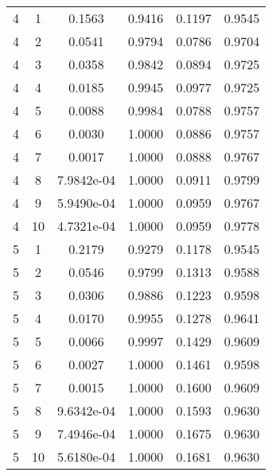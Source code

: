 \begin{center}
\begin{longtable}{|c|c|c|c|c|c|}
\hline
4 & 1 & 0.1563 & 0.9416 & 0.1197 & 0.9545 \\
4 & 2 & 0.0541 & 0.9794 & 0.0786 & 0.9704 \\
4 & 3 & 0.0358 & 0.9842 & 0.0894 & 0.9725 \\
4 & 4 & 0.0185 & 0.9945 & 0.0977 & 0.9725 \\
4 & 5 & 0.0088 & 0.9984 & 0.0788 & 0.9757 \\
4 & 6 & 0.0030 & 1.0000 & 0.0886 & 0.9757 \\
4 & 7 & 0.0017 & 1.0000 & 0.0888 & 0.9767 \\
4 & 8 & 7.9842e-04 & 1.0000 & 0.0911 & 0.9799 \\
4 & 9 & 5.9490e-04 & 1.0000 & 0.0959 & 0.9767 \\
4 & 10 & 4.7321e-04 & 1.0000 & 0.0959 & 0.9778 \\
\hline
5 & 1 & 0.2179 & 0.9279 & 0.1178 & 0.9545 \\
5 & 2 & 0.0546 & 0.9799 & 0.1313 & 0.9588 \\
5 & 3 & 0.0306 & 0.9886 & 0.1223 & 0.9598 \\
5 & 4 & 0.0170 & 0.9955 & 0.1278 & 0.9641 \\
5 & 5 & 0.0066 & 0.9997 & 0.1429 & 0.9609 \\
5 & 6 & 0.0027 & 1.0000 & 0.1461 & 0.9598 \\
5 & 7 & 0.0015 & 1.0000 & 0.1600 & 0.9609 \\
5 & 8 & 9.6342e-04 & 1.0000 & 0.1593 & 0.9630 \\
5 & 9 & 7.4946e-04 & 1.0000 & 0.1675 & 0.9630 \\
5 & 10 & 5.6180e-04 & 1.0000 & 0.1681 & 0.9630 \\
\hline
\end{longtable}
\label{table:resnet50}
\end{center}




